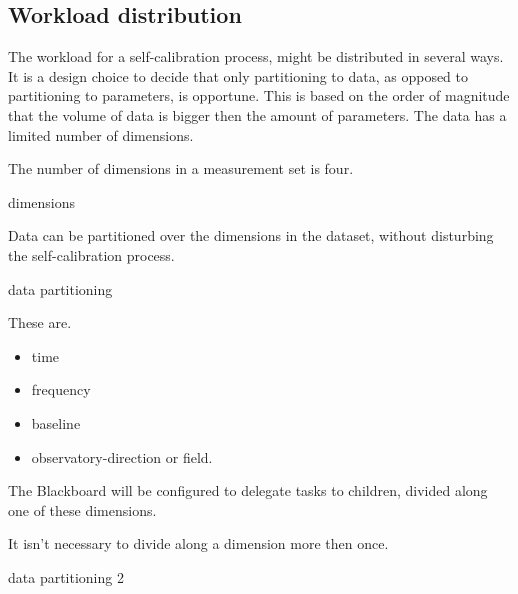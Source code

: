 \documentclass[]{lofar}
\begin{document}
    \subsection{Workload distribution}
    \label{subsec:workload-distribution}\hypertarget{subsec:workload-distribution}{}%

      The workload for a self-calibration process, might be
      distributed in several ways. It is a design choice to decide
      that only partitioning to data, as opposed to partitioning to
      parameters, is opportune. This is based on the order of
      magnitude that the volume of data is bigger then the amount of
      parameters. The data has a limited number of dimensions.

      \begin{assumption}
        The number of dimensions in a measurement set is four.
        \caption{dimensions\label{ass:dimensions}}
      \end{assumption}

      \begin{assumption}
        Data can be partitioned over the dimensions in the dataset,
        without disturbing the self-calibration process.
        \caption{data partitioning\label{ass:partitioning}}
      \end{assumption}

      These are.

      \begin{itemize}

        \item 

          time

	\item 

          frequency

	\item 

          baseline

	\item 

          observatory-direction or field.

      \end{itemize}

      The Blackboard will be configured to delegate tasks to children,
      divided along one of these dimensions.

      \begin{assumption}
        It isn't necessary to divide along a dimension more then once.
        \caption{data partitioning 2\label{ass:devision}}
      \end{assumption}
\end{document}
